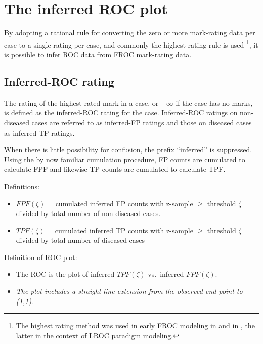 \documentclass[
]{book}
\providecommand{\tightlist}{%
  \setlength{\itemsep}{0pt}\setlength{\parskip}{0pt}}
\begin{document}
\hypertarget{froc-empirical-ROC}{%
\section{The inferred ROC plot}\label{froc-empirical-ROC}}

By adopting a rational rule for converting the zero or more mark-rating data per case to a single rating per case, and commonly the highest rating rule is used \footnote{The highest rating method was used in early FROC modeling in \citep{bunch1977free} and in \citep{swensson1996unified}, the latter in the context of LROC paradigm modeling.}, it is possible to infer ROC data from FROC mark-rating data.

\hypertarget{inferred-roc-rating}{%
\subsection{Inferred-ROC rating}\label{inferred-roc-rating}}

The rating of the highest rated mark in a case, or \(-\infty\) if the case has no marks, is defined as the inferred-ROC rating for the case. Inferred-ROC ratings on non-diseased cases are referred to as inferred-FP ratings and those on diseased cases as inferred-TP ratings.

When there is little possibility for confusion, the prefix ``inferred'' is suppressed. Using the by now familiar cumulation procedure, FP counts are cumulated to calculate FPF and likewise TP counts are cumulated to calculate TPF.

Definitions:

\begin{itemize}
\tightlist
\item
  \(FPF(\zeta)\) = cumulated inferred FP counts with z-sample \(\geq\) threshold \(\zeta\) divided by total number of non-diseased cases.
\item
  \(TPF(\zeta)\) = cumulated inferred TP counts with z-sample \(\geq\) threshold \(\zeta\) divided by total number of diseased cases
\end{itemize}

Definition of ROC plot:

\begin{itemize}
\tightlist
\item
  The ROC is the plot of inferred \(TPF(\zeta)\) vs.~inferred \(FPF(\zeta)\).
\item
  \emph{The plot includes a straight line extension from the observed end-point to (1,1)}.
\end{itemize}
\end{document}
